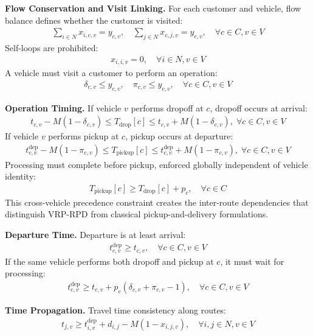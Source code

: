 \documentclass[sigconf]{acmart}
\begin{document}
\textbf{Flow Conservation and Visit Linking.}
For each customer and vehicle, flow balance defines whether the customer is
visited:
\begin{align}
\sum_{i\in N} x_{i,c,v} = y_{c,v},\quad \sum_{j\in N} x_{c,j,v} = y_{c,v},
\quad \forall c\in C, v\in V
\end{align}
Self-loops are prohibited:
\begin{align}
x_{i,i,v}=0,\quad \forall i\in N, v\in V
\end{align}
A vehicle must visit a customer to perform an operation:
\begin{align}
\delta_{c,v}\le y_{c,v},\quad \pi_{c,v}\le y_{c,v},\quad \forall c\in C, v\in V
\end{align}

\textbf{Operation Timing.}
If vehicle $v$ performs dropoff at $c$, dropoff occurs at arrival:
\begin{align}
t_{c,v} - M(1-\delta_{c,v}) \le T_{\text{drop}}[c] \le t_{c,v} + M(1-\delta_{c,v}),
\;\forall c\in C, v\in V
\end{align}
If vehicle $v$ performs pickup at $c$, pickup occurs at departure:
\begin{align}
t^{\text{dep}}_{c,v} - M(1-\pi_{c,v}) \le T_{\text{pickup}}[c] \le
t^{\text{dep}}_{c,v} + M(1-\pi_{c,v}),
\;\forall c\in C, v\in V
\end{align}
Processing must complete before pickup, enforced globally independent of vehicle
identity:
\begin{align}
T_{\text{pickup}}[c] \ge T_{\text{drop}}[c] + p_c,\quad \forall c\in C
\end{align}
This cross-vehicle precedence constraint creates the inter-route dependencies
that distinguish VRP-RPD from classical pickup-and-delivery formulations.

\textbf{Departure Time.}
Departure is at least arrival:
\begin{align}
t^{\text{dep}}_{c,v} \ge t_{c,v},\quad \forall c\in C, v\in V
\end{align}
If the same vehicle performs both dropoff and pickup at $c$, it must wait for
processing:
\begin{align}
t^{\text{dep}}_{c,v} \ge t_{c,v} + p_c(\delta_{c,v}+\pi_{c,v}-1),
\quad \forall c\in C, v\in V
\end{align}

\textbf{Time Propagation.}
Travel time consistency along routes:
\begin{align}
t_{j,v} \ge t^{\text{dep}}_{i,v} + d_{i,j} - M(1-x_{i,j,v}),
\quad \forall i,j\in N, v\in V
\end{align}
\end{document}
